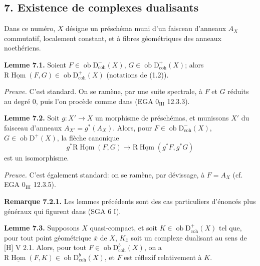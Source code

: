 \documentclass[11pt]{article}
\DeclareMathOperator{\Hom}{Hom}
\newcommand{\R}{\mathrm{R}}
\newcommand{\D}{\mathrm{D}}
\newcommand{\ob}{\operatorname{ob}}
\providecommand{\Hom}{\operatorname{Hom}}
\providecommand{\ob}{\operatorname{ob}}
\providecommand{\R}{\mathrm R}
\providecommand{\Hom}{\operatorname{Hom}}
\begin{document}
\subsection*{7. Existence de complexes dualisants}

Dans ce numéro, $X$ désigne un préschéma muni d'un faisceau d'anneaux $A_X$ commutatif, localement constant, et à fibres géométriques des anneaux noethériens.

\textbf{Lemme 7.1.} Soient $F\in\ob\D^{-}_{\mathrm{coh}}(X)$, $G\in\ob\D^{+}_{\mathrm{coh}}(X)$; alors $\R\underline{\Hom}(F,G)\in\ob\D^{+}_{\mathrm{coh}}(X)$ (notations de (1.2)).

\emph{Preuve.} C'est standard. On se ramène, par une suite spectrale, à $F$ et $G$ réduits au degré $0$, puis l'on procède comme dans (EGA $0_{\mathrm{III}}$ 12.3.3).

\textbf{Lemme 7.2.} Soit $g:X'\to X$ un morphisme de préschémas, et munissons $X'$ du faisceau d'anneaux $A_{X'}=g^*(A_X)$. Alors, pour $F\in\ob\D^{-}_{\mathrm{coh}}(X)$, $G\in\ob\D^{+}(X)$, la flèche canonique
\[
        g^*\R\underline{\Hom}(F,G)\longrightarrow \R\underline{\Hom}(g^*F,g^*G)
\]
est un isomorphisme.

\emph{Preuve.} C'est également standard: on se ramène, par dévissage, à $F=A_X$ (cf. EGA $0_{\mathrm{III}}$ 12.3.5).

\textbf{Remarque 7.2.1.} Les lemmes précédents sont des cas particuliers d'énoncés plus généraux qui figurent dans (SGA 6 I).

\textbf{Lemme 7.3.} Supposons $X$ quasi-compact, et soit $K\in\ob\D^{+}_{\mathrm{coh}}(X)$ tel que, pour tout point géométrique $\bar{x}$ de $X$, $K_{\bar{x}}$ soit un complexe dualisant au sens de [H] V 2.1. Alors, pour tout $F\in\ob\D^{b}_{\mathrm{coh}}(X)$, on a $\R\underline{\Hom}(F,K)\in\ob\D^{b}_{\mathrm{coh}}(X)$, et $F$ est réflexif relativement à $K$.
\end{document}
